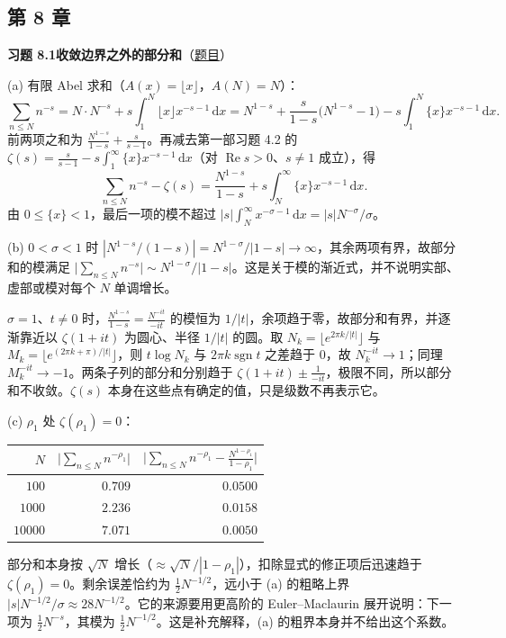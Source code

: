 \documentclass[11pt,a4paper]{article}
\newcommand{\dd}{\,\mathrm{d}}
\renewcommand{\Re}{\operatorname{Re}}
\newcommand{\Sol}[2]{%
  \par\addvspace{1.2em}\noindent
  \hypertarget{s:#1}{}\textbf{习题 #1\quad #2}\hfill{\small（\hyperlink{q:#1}{题目}）}\par
  \nopagebreak\smallskip}
\begin{document}
\subsection*{第 8 章}

\Sol{8.1}{收敛边界之外的部分和}
(a) 有限 Abel 求和（$A(x)=\lfloor x\rfloor$，$A(N)=N$）：
\[
  \sum_{n\le N}n^{-s}=N\cdot N^{-s}+s\int_1^N\lfloor x\rfloor x^{-s-1}\dd x
  =N^{1-s}+\frac{s}{1-s}\bigl(N^{1-s}-1\bigr)-s\int_1^N\{x\}x^{-s-1}\dd x .
\]
前两项之和为 $\frac{N^{1-s}}{1-s}+\frac{s}{s-1}$。再减去第一部习题 4.2 的
$\zeta(s)=\frac{s}{s-1}-s\int_1^\infty\{x\}x^{-s-1}\dd x$（对 $\Re s>0$、$s\ne1$ 成立），得
\[
  \sum_{n\le N}n^{-s}-\zeta(s)=\frac{N^{1-s}}{1-s}+s\int_N^\infty\{x\}x^{-s-1}\dd x .
\]
由 $0\le\{x\}<1$，最后一项的模不超过 $|s|\int_N^\infty x^{-\sigma-1}\dd x=|s|N^{-\sigma}/\sigma$。

(b) $0<\sigma<1$ 时 $|N^{1-s}/(1-s)|=N^{1-\sigma}/|1-s|\to\infty$，其余两项有界，故部分和的模满足 $\bigl|\sum_{n\le N}n^{-s}\bigr|\sim N^{1-\sigma}/|1-s|$。这是关于模的渐近式，并不说明实部、虚部或模对每个 $N$ 单调增长。

$\sigma=1$、$t\ne0$ 时，$\frac{N^{1-s}}{1-s}=\frac{N^{-it}}{-it}$ 的模恒为 $1/|t|$，余项趋于零，故部分和有界，并逐渐靠近以 $\zeta(1+it)$ 为圆心、半径 $1/|t|$ 的圆。取 $N_k=\lfloor e^{2\pi k/|t|}\rfloor$ 与 $M_k=\lfloor e^{(2\pi k+\pi)/|t|}\rfloor$，则 $t\log N_k$ 与 $2\pi k\operatorname{sgn}t$ 之差趋于 $0$，故 $N_k^{-it}\to1$；同理 $M_k^{-it}\to-1$。两条子列的部分和分别趋于 $\zeta(1+it)\pm\frac1{-it}$，极限不同，所以部分和不收敛。$\zeta(s)$ 本身在这些点有确定的值，只是级数不再表示它。

(c) $\rho_1$ 处 $\zeta(\rho_1)=0$：
\begin{center}
\begin{tabular}{rrr}
\toprule
$N$ & $\bigl|\sum_{n\le N}n^{-\rho_1}\bigr|$ & $\bigl|\sum_{n\le N}n^{-\rho_1}-\frac{N^{1-\rho_1}}{1-\rho_1}\bigr|$\\
\midrule
$100$ & $0.709$ & $0.0500$\\
$1000$ & $2.236$ & $0.0158$\\
$10000$ & $7.071$ & $0.0050$\\
\bottomrule
\end{tabular}
\end{center}
部分和本身按 $\sqrt N$ 增长（$\approx\sqrt N/|1-\rho_1|$），扣除显式的修正项后迅速趋于 $\zeta(\rho_1)=0$。剩余误差恰约为 $\tfrac12N^{-1/2}$，远小于 (a) 的粗略上界 $|s|N^{-1/2}/\sigma\approx28N^{-1/2}$。它的来源要用更高阶的 Euler--Maclaurin 展开说明：下一项为 $\tfrac12N^{-s}$，其模为 $\tfrac12N^{-1/2}$。这是补充解释，(a) 的粗界本身并不给出这个系数。
\end{document}
